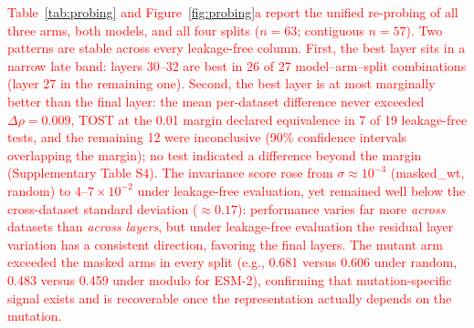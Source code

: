 \documentclass[numbered,webpdf,modern,large]{oup-authoring-template}
\newcommand{\rev}[1]{\textcolor{red}{#1}}
\begin{document}
\rev{Table~\ref{tab:probing} and Figure~\ref{fig:probing}a report the unified
re-probing of all three arms,
both models, and all four splits ($n = 63$; contiguous $n = 57$). Two patterns are
stable across every leakage-free column. First, the best layer sits in a narrow late
band: layers 30--32 are best in 26 of 27 model--arm--split combinations (layer 27 in
the remaining one). Second, the best layer is at most marginally better than the
final layer: the mean per-dataset difference never exceeded $\Delta\rho = 0.009$,
TOST at the 0.01 margin declared equivalence in 7 of 19 leakage-free tests, and the
remaining 12 were inconclusive (90\% confidence intervals overlapping the margin); no
test indicated a difference beyond the margin (Supplementary Table S4). The
invariance score rose from $\sigma \approx 10^{-3}$ (masked\_wt, random) to
$4$--$7 \times 10^{-2}$ under leakage-free evaluation, yet remained well below the
cross-dataset standard deviation ($\approx 0.17$): performance varies far more
\emph{across} datasets than \emph{across layers}, but under leakage-free evaluation
the residual layer variation has a consistent direction, favoring the final layers.
The mutant arm exceeded the masked arms in every split (e.g., 0.681 versus 0.606
under random, 0.483 versus 0.459 under modulo for ESM-2), confirming that
mutation-specific signal exists and is recoverable once the representation actually
depends on the mutation.}
\end{document}
